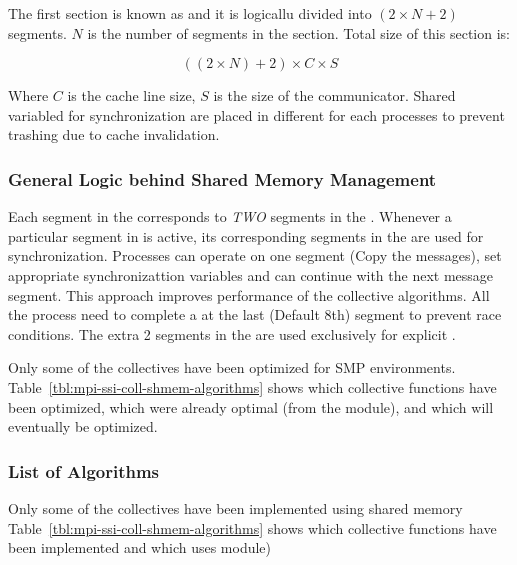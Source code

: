 The first section is known as  and it is
logicallu divided into $(2 \times N + 2)$ segments.  $N$ is the number
of segments in the  section.  Total size of this
section is:

\[
((2 \times N) + 2) \times C \times S 
\]

Where $C$ is the cache line size, $S$ is the size of the communicator.
Shared variabled for synchronization are placed in different
 for each processes to prevent trashing due to cache
invalidation.  


\subsubsection{General Logic behind Shared Memory Management}

Each segment in the  corresponds to {\em TWO}
segments in the .  Whenever a particular segment
in  is active, its corresponding segments in the
 are used for synchronization.  Processes can
operate on one segment (Copy the messages), set appropriate
synchronizattion variables and can continue with the next message
segment.  This approach improves performance of the collective
algorithms. All the process need to complete a 
 at the last (Default 8th) segment to prevent race conditions.  The
 extra 2 segments in the  are used exclusively
 for explicit . 

Only some of the collectives have been optimized for SMP environments.
Table~\ref{tbl:mpi-ssi-coll-shmem-algorithms} shows which collective
functions have been optimized, which were already optimal (from the
 module), and which will eventually be optimized.


\subsubsection{List of Algorithms}

Only some of the collectives have been implemented using shared memory
Table~\ref{tbl:mpi-ssi-coll-shmem-algorithms} shows which collective
functions have been implemented and which uses 
module)

\def\shmemopt{Implemented using shared memory.}
\def\shmemnoopt{Uses \coll{lam\_\-basic} algorithm.}


